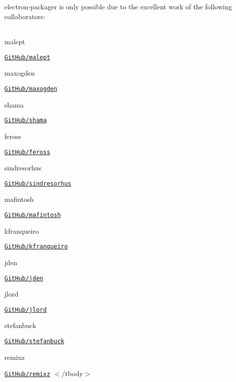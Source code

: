 electron-\/packager is only possible due to the excellent work of the following collaborators\+:

\tabulinesep=1mm
\begin{longtabu} spread 0pt [c]{*{0}{|X[-1]}|}
\hline
\end{longtabu}


malept

\href{https://github.com/malept}{\tt Git\+Hub/malept} 

maxogden

\href{https://github.com/maxogden}{\tt Git\+Hub/maxogden} 

shama

\href{https://github.com/shama}{\tt Git\+Hub/shama} 

feross

\href{https://github.com/feross}{\tt Git\+Hub/feross} 

sindresorhus

\href{https://github.com/sindresorhus}{\tt Git\+Hub/sindresorhus} 

mafintosh

\href{https://github.com/mafintosh}{\tt Git\+Hub/mafintosh} 

kfranqueiro

\href{https://github.com/kfranqueiro}{\tt Git\+Hub/kfranqueiro} 

jden

\href{https://github.com/jden}{\tt Git\+Hub/jden} 

jlord

\href{https://github.com/jlord}{\tt Git\+Hub/jlord} 

stefanbuck

\href{https://github.com/stefanbuck}{\tt Git\+Hub/stefanbuck} 

remixz

\href{https://github.com/remixz}{\tt Git\+Hub/remixz} $<$/tbody$>$